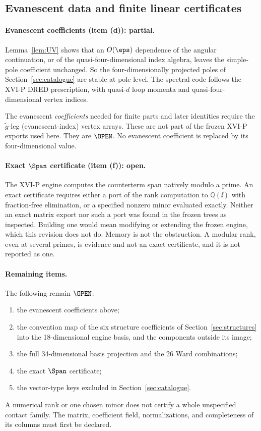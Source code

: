 \subsection{Evanescent data and finite linear certificates}

\paragraph{Evanescent coefficients (item (d)): partial.}
Lemma~\ref{lem:UV} shows that an \(O(\eps)\) dependence of the
angular continuation, or of the quasi-four-dimensional index
algebra, leaves the simple-pole coefficient unchanged.
So the four-dimensionally projected poles of
Section~\ref{sec:catalogue} are stable at pole level.
The spectral code follows the XVI-P DRED prescription, with
quasi-\(d\) loop momenta and quasi-four-dimensional vertex indices.

The evanescent \emph{coefficients} needed for finite parts and
later identities require the \(\tilde g\)-leg (evanescent-index)
vertex arrays.
These are not part of the frozen XVI-P exports used here.
They are \(\OPEN\).
No evanescent coefficient is replaced by its four-dimensional value.

\paragraph{Exact \(\Span\) certificate (item (f)): open.}
The XVI-P engine computes the counterterm span natively modulo a
prime.
An exact certificate requires either a port of the rank computation
to \(\mathbb Q(\ii)\) with fraction-free elimination, or a
specified nonzero minor evaluated exactly.
Neither an exact matrix export nor such a port was found in the
frozen trees as inspected.
Building one would mean modifying or extending the frozen engine,
which this revision does not do.
Memory is not the obstruction.
A modular rank, even at several primes, is evidence and not an
exact certificate, and it is not reported as one.

\paragraph{Remaining items.}
The following remain \(\OPEN\):
\begin{enumerate}[label=\textup{(\roman*)}]
\item the evanescent coefficients above;
\item the convention map of the six structure coefficients of
Section~\ref{sec:structures} into the 18-dimensional engine basis,
and the components outside its image;
\item the full 34-dimensional basis projection and the 26 Ward
combinations;
\item the exact \(\Span\) certificate;
\item the vector-type keys excluded in Section~\ref{sec:catalogue}.
\end{enumerate}
A numerical rank or one chosen minor does not certify a whole
unspecified contact family. The matrix, coefficient field,
normalizations, and completeness of its columns must first be
declared.
